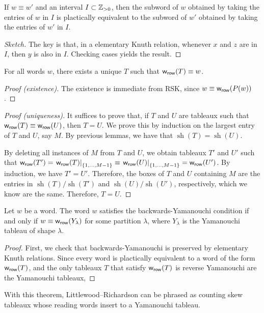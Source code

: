 \begin{lemma}
    If \(w \equiv w'\) and an interval \(I \subset \mathbb{Z}_{> 0}\),
    then the subword of \(w\) obtained by taking the entries of \(w\) in \(I\) is plactically equivalent to the subword of \(w'\) obtained by taking the entries of \(w'\) in \(I\).
\end{lemma}

\begin{proof}[Sketch]
    The key is that, in a elementary Knuth relation,
    whenever \(x\) and \(z\) are in \(I\), then \(y\) is also in \(I\).
    Checking cases yields the result.
\end{proof}

\begin{theorem}
    For all words \(w\), there exists a unique \(T\) such that \(\operatorname{\mathsf{w}_{\text{\textsf{row}}}}(T) \equiv w\).
\end{theorem}

\begin{proof}[Proof (existence)]
    The existence is immediate from RSK, since \(w \equiv \operatorname{\mathsf{w}_{\text{\textsf{row}}}}(P(w))\).
\end{proof}

\begin{proof}[Proof (uniqueness)]
    It suffices to prove that, if \(T\) and \(U\) are tableaux such that \(\operatorname{\mathsf{w}_{\text{\textsf{row}}}}(T) \equiv \operatorname{\mathsf{w}_{\text{\textsf{row}}}}(U)\), then \(T = U\).
    We prove this by induction on the largest entry of \(T\) and \(U\), say \(M\).
    By previous lemmas, we have that \(\operatorname{sh}(T) = \operatorname{sh}(U)\).

    By deleting all instances of \(M\) from \(T\) and \(U\), we obtain tableaux \(T'\) and \(U'\) such that \(\rowword(T') = \left. \rowword(T) \right|_{\interval{M-1}} \equiv \left. \rowword(U) \right|_{\interval{M-1}} = \rowword(U')\).
    By induction, we have \(T' = U'\).
    Therefore, the boxes of \(T\) and \(U\) containing \(M\) are the entries in \(\operatorname{sh}(T) / \operatorname{sh}(T')\) and \(\operatorname{sh}(U) / \operatorname{sh}(U')\), respectively, which we know are the same.
    Therefore, \(T = U\).
\end{proof}

\begin{theorem}
    Let \(w\) be a word.
    The word \(w\) satisfies the backwards-Yamanouchi condition
    if and only if
    \(w \equiv \operatorname{\mathsf{w}_{\text{\textsf{row}}}}(Y_\lambda)\) for some partition \(\lambda\),
    where \(Y_\lambda\) is the Yamanouchi tableau of shape \(\lambda\).
\end{theorem}

\begin{proof}
    First, we check that backwards-Yamanouchi is preserved by elementary Knuth relations.
    Since every word is plactically equivalent to a word of the form \(\operatorname{\mathsf{w}_{\text{\textsf{row}}}}(T)\),
    and the only tableaux \(T\) that satisfy \(\operatorname{\mathsf{w}_{\text{\textsf{row}}}}(T)\) is reverse Yamanouchi are the Yamanouchi tableaux,
\end{proof}

With this theorem, Littlewood--Richardson can be phrased as counting skew tableaux
whose reading words insert to a Yamanouchi tableau.